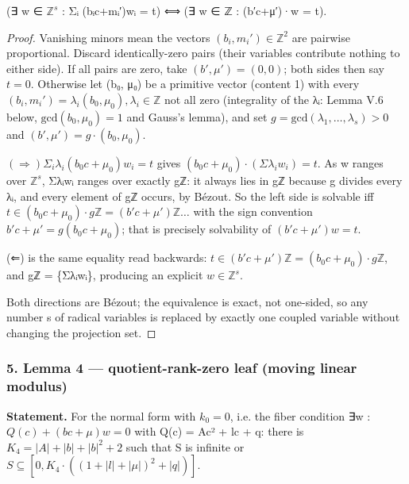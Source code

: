 (∃ w ∈ $ℤ^{s}$ : Σᵢ (bᵢc+mᵢ′)wᵢ = t)  ⟺  (∃ w ∈ ℤ : (b′c+μ′)·w = t).

\begin{proof}
Vanishing minors mean the vectors $(b_{i}, m_{i}′) ∈ ℤ^{2}$ are pairwise proportional. Discard identically-zero pairs (their variables contribute nothing to either side). If all pairs are zero, take $(b′, μ′) = (0,0)$; both sides then say $t = 0$. Otherwise let (b₀, μ₀) be a primitive vector (content 1) with every $(b_{i}, m_{i}′) = λ_{i}(b_{0}, μ_{0}), λ_{i} ∈ ℤ$ not all zero (integrality of the λᵢ: Lemma V.6 below, $\mathrm{gcd}(b_{0},μ_{0}) = 1$ and Gauss's lemma), and set $g = \mathrm{gcd}(λ_{1},…,λ_{s}) > 0$ and $(b′, μ′) = g·(b_{0}, μ_{0})$.

$(⇒) Σ_{i} λ_{i}(b_{0}c+μ_{0})w_{i} = t$ gives $(b_{0}c+μ_{0})·(Σλ_{i}w_{i}) = t$. As w ranges over $ℤ^{s}$, Σλᵢwᵢ ranges over exactly gℤ: it always lies in gℤ because g divides every λᵢ, and every element of gℤ occurs, by Bézout. So the left side is solvable iff $t ∈ (b_{0}c+μ_{0})·gℤ = (b′c+μ′)ℤ…$ with the sign convention $b′c+μ′ = g(b_{0}c+μ_{0})$; that is precisely solvability of $(b′c+μ′)w = t$.

(⇐) is the same equality read backwards: $t ∈ (b′c+μ′)ℤ = (b_{0}c+μ_{0})·gℤ$, and gℤ = \{Σλᵢwᵢ\}, producing an explicit $w ∈ ℤ^{s}$.

Both directions are Bézout; the equivalence is exact, not one-sided, so any number s of radical variables is replaced by exactly one coupled variable without changing the projection set.

\end{proof}
\subsubsection*{5. Lemma 4 — quotient-rank-zero leaf (moving linear modulus)}
\textbf{Statement.} For the normal form with $k_{0} = 0$, i.e. the fiber condition ∃w : $Q(c) + (bc+μ)w = 0$ with Q(c) = Ac² + lc + q: there is $K_{4} = |A| + |b| + |b|^{2} + 2$ such that S is infinite or $S ⊆ [0, K_{4}·((1+|l|+|μ|)^{2}+|q|)]$.

